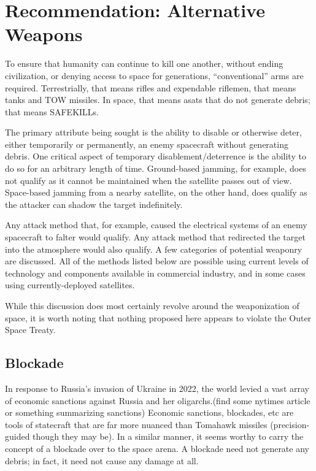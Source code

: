 \section{Recommendation: Alternative Weapons}

To ensure that humanity can continue to kill one another, without
ending civilization, or denying access to space for generations,
``conventional'' arms are required.  Terrestrially, that means rifles
and expendable riflemen, that means tanks and TOW missiles.  In space,
that means \acp{asat} that do not generate debris; that means
SAFEKILLs.

The primary attribute being sought is the ability to disable or
otherwise deter, either temporarily or permanently, an enemy
spacecraft without generating debris.  One critical aspect of
temporary disablement/deterrence is the ability to do so for an
arbitrary length of time.  Ground-based jamming, for example, does not
qualify as it cannot be maintained when the satellite passes out of
view.  Space-based jamming from a nearby satellite, on the other hand,
does qualify as the attacker can shadow the target indefinitely.

Any attack method that, for example, caused the electrical systems of
an enemy spacecraft to falter would qualify.  Any attack method that
redirected the target into the atmosphere would also qualify.  A few
categories of potential weaponry are discussed.  All of the methods
listed below are possible using current levels of technology and
components available in commercial industry, and in some cases using
currently-deployed satellites.

While this discussion does most certainly revolve around the
weaponization of space, it is worth noting that nothing proposed here
appears to violate the Outer Space Treaty.\cite{outer-space}

\subsection{Blockade}
In response to Russia's invasion of Ukraine in 2022, the world levied
a vast array of economic sanctions against Russia and her
oligarchs.(find some nytimes article or something summarizing
sanctions) Economic sanctions, blockades, etc are tools of statecraft
that are far more nuanced than Tomahawk missiles (precision-guided
though they may be).  In a similar manner, it seems worthy to carry
the concept of a blockade over to the space arena.  A blockade need
not generate any debris; in fact, it need not cause any damage at all.

